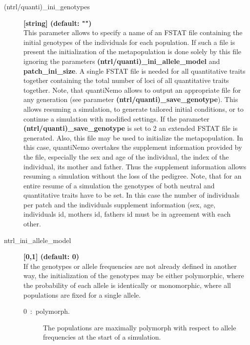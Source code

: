 \documentclass[letterpaper,12pt,oneside]{book}
\begin{document}
\begin{description}
\item[(ntrl/quanti)\_ini\_genotypes] \textbf{[string] (default: "")}\\
This parameter allows to specify a name of an FSTAT file \citep{Goudet_1995} containing the initial genotypes of the individuals for each population. If such a file is present the initialization of the metapopulation is done solely by this file ignoring the parameters \textbf{(ntrl/quanti)\_ini\_allele\_model} and \textbf{patch\_ini\_size}. A single FSTAT file is needed for all quantitative traits together containing the total number of loci of all quantitative traits together. Note, that quantiNemo allows to output an appropriate file for any generation (see parameter \textbf{(ntrl/quanti)\_save\_genotype}). This allows resuming a simulation, to generate tailored initial conditions, or to continue a simulation with modified settings. If the parameter \textbf{(ntrl/quanti)\_save\_genotype} is set to 2 an extended FSTAT file is generated. Also, this file may be used to initialize the metapopulation. In this case, quantiNemo overtakes the supplement information provided by the file, especially the sex and age of the individual, the index of the individual, its mother and father. Thus the supplement information allows resuming a simulation without the loss of the pedigree. Note, that for an entire resume of a simulation the genotypes of both neutral and quantitative traits have to be set. In this case the number of individuals per patch and the individuals supplement information (sex, age, individuals id, mothers id, fathers id must be in agreement with each other. 

\item[ntrl\_ini\_allele\_model] \textbf{[0,1] (default: 0)}\\

If the genotypes or allele frequencies are not already defined in another way, the initialization of the genotypes may be either polymorphic, where the probability of each allele is identically or monomorphic, where all populations are fixed for a single allele.  

\begin{description}

\item[0~:~polymorph.] The populations are maximally polymorph with respect to allele frequencies at the start of a simulation.


\end{description}
\end{description}
\end{document}
